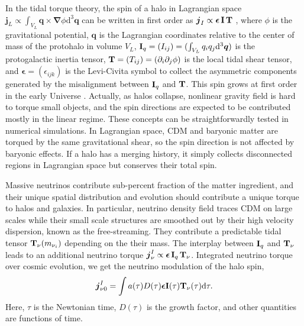 \documentclass[aps,prd,twocolumn,amsmath,amssymb,amsfont,superscriptaddress]{revtex4-1}
\newcommand{\bs}{\boldsymbol}
\newcommand{\diff}{{\mathrm d}}
\newcommand{\T}{\bold{T}}
\newcommand{\I}{\bold{I}}
\newcommand{\spin}{\bs{j}}
\begin{document}
In the tidal torque theory, the spin of a halo in Lagrangian space $\spin_L\propto\int_{V_L}\bs{q}\times\bs{\nabla}\phi\diff^3\bs{q}$ 
can be written in first order as $\spin_I\propto\bs{\epsilon}\,\I\,\T$ \citep{1984ApJ...286...38W}, 
where $\phi$ is the gravitational potential, $\bs{q}$ is the Lagrangian coordinates relative to the center of mass of the protohalo in volume $V_L$, 
$\I_q=(I_{ij})=(\int_{V_L} q_i q_j \diff^3\bs{q})$ is the protogalactic inertia tensor, 
$\T=(T_{ij})=(\partial_i\partial_j\phi)$ is the local tidal shear tensor, 
and $\bs{\epsilon}=(\epsilon_{ijk})$ is the Levi-Civita symbol to collect the asymmetric components generated by
the misalignment between $\I_q$ and $\T$. This spin grows at first order in the early Universe \citep{1984ApJ...286...38W}. 
Actually, as halos collapse, nonlinear gravity field is hard to torque small objects, and the spin directions are expected  to be contributed mostly in the linear regime. These concepts can be straightforwardly tested in numerical simulations. 
In Lagrangian space, CDM and baryonic matter are torqued by the same gravitational shear, so the spin direction is not affected by baryonic effects. 
If a halo has a merging history, it simply collects disconnected regions in Lagrangian space but conserves their total spin. 

Massive neutrinos contribute sub-percent fraction of the matter ingredient, and their unique spatial distribution and evolution should contribute a unique torque to halos and galaxies.
In particular, neutrino density field traces CDM on large scales while their small scale structures are smoothed out by their high velocity dispersion, known as the free-streaming. 
They contribute a predictable tidal tensor $\T_\nu(m_{\nu_i})$ depending on the their mass. 
The interplay between $\I_q$ and $\T_\nu$ leads to an additional neutrino torque $\spin^I_\nu\propto\bs{\epsilon}\,\I_q\,\T_\nu$.
Integrated neutrino torque over cosmic evolution, we get the neutrino modulation of the halo spin,
\begin{equation}\label{eq.jnu0}
\spin^I_{\nu 0}=\int a(\tau)D(\tau)\bs{\epsilon}\I(\tau)\T_\nu(\tau)\diff\tau.
\end{equation}
Here, $\tau$ is the Newtonian time, $D(\tau)$ is the growth factor, and other quantities are functions of time.
\end{document}
